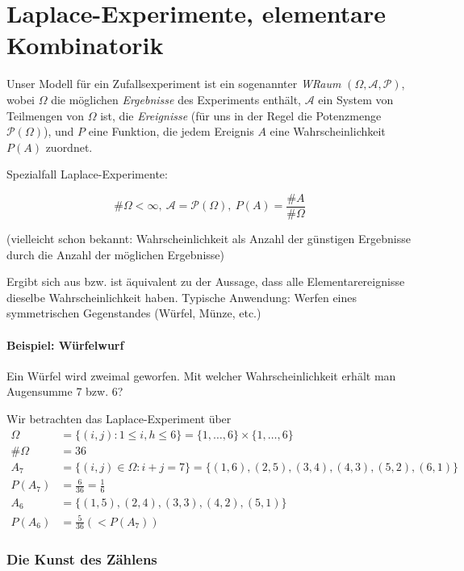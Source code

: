 \part{Laplace-Experimente, elementare Kombinatorik}

Unser Modell für ein Zufallsexperiment ist ein sogenannter \emph{WRaum}
$(\Omega,\mathcal{A},\mathcal{P})$, wobei $\Omega$ die möglichen
\emph{Ergebnisse} des Experiments enthält, $\mathcal{A}$ ein System von
Teilmengen von $\Omega$ ist, die \emph{Ereignisse} (für uns in der Regel die
Potenzmenge $\mathcal{P}(\Omega)$), und $P$ eine Funktion, die jedem Ereignis
$A$ eine Wahrscheinlichkeit $P(A)$ zuordnet.

Spezialfall Laplace-Experimente:

\begin{displaymath}
\#\Omega < \infty, \ \mathcal{A} = \mathcal{P}(\Omega), \ P(A) =
\frac{\#A}{\#\Omega}
\end{displaymath}

(vielleicht schon bekannt: Wahrscheinlichkeit als Anzahl der günstigen
Ergebnisse durch die Anzahl der möglichen Ergebnisse)

Ergibt sich aus bzw. ist äquivalent zu der Aussage, dass alle
Elementarereignisse dieselbe Wahrscheinlichkeit haben. Typische Anwendung:
Werfen eines symmetrischen Gegenstandes (Würfel, Münze, etc.)


\subsection{Beispiel: Würfelwurf}

Ein Würfel wird zweimal geworfen. Mit welcher Wahrscheinlichkeit erhält man
Augensumme 7 bzw. 6?

Wir betrachten das Laplace-Experiment über
\begin{align*}
\Omega &= \{ (i,j) : 1 \leq i,h \leq 6 \} = \{ 1,\ldots,6 \} \times
\{ 1,\ldots,6 \} \\
\#\Omega &= 36 \\
A_7 &= \{ (i,j) \in \Omega : i+j = 7\} = \{ (1,6), (2,5), (3,4), (4,3), (5,2),
(6,1) \} \\
P(A_7) &= \frac{6}{36} = \frac{1}{6} \\
A_6 &= \{ (1,5), (2,4), (3,3), (4,2), (5,1) \} \\
P(A_6) &= \frac{5}{36} ( < P(A_7))
\end{align*}


\section{Die Kunst des Zählens}

